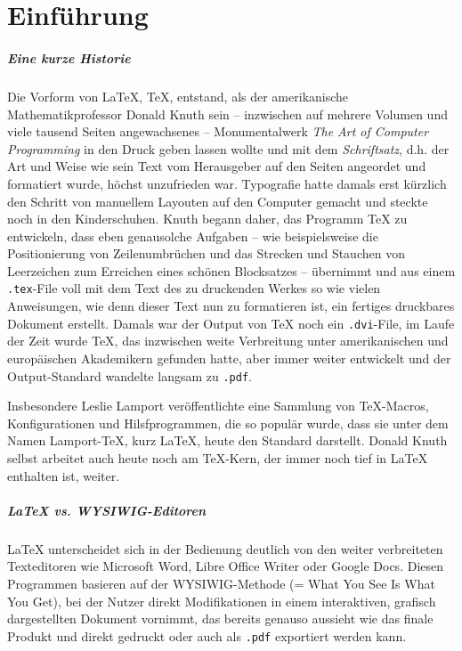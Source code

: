 \chapter{Einführung}

\paragraph{Eine kurze Historie}
Die Vorform von \LaTeX{}, \TeX{}, entstand, als der amerikanische Mathematikprofessor Donald Knuth sein -- inzwischen auf mehrere Volumen und viele tausend Seiten angewachsenes -- Monumentalwerk \emph{The Art of Computer Programming} in den Druck geben lassen wollte und mit dem \emph{Schriftsatz}, d.h. der Art und Weise wie sein Text vom Herausgeber auf den Seiten angeordet und formatiert wurde, höchst unzufrieden war.
Typografie hatte damals erst kürzlich den Schritt von manuellem Layouten auf den Computer gemacht und steckte noch in den Kinderschuhen.
Knuth begann daher, das Programm \TeX{} zu entwickeln, dass eben genausolche Aufgaben -- wie beispielsweise die Positionierung von Zeilenumbrüchen und das Strecken und Stauchen von Leerzeichen zum Erreichen eines schönen Blocksatzes -- übernimmt und aus einem \texttt{.tex}-File voll mit dem Text des zu druckenden Werkes so wie vielen Anweisungen, wie denn dieser Text nun zu formatieren ist, ein fertiges druckbares Dokument erstellt.
Damals war der Output von \TeX{} noch ein \texttt{.dvi}-File, im Laufe der Zeit wurde \TeX{}, das inzwischen weite Verbreitung unter amerikanischen und europäischen Akademikern gefunden hatte, aber immer weiter entwickelt und der Output-Standard wandelte langsam zu \texttt{.pdf}.

Insbesondere Leslie Lamport veröffentlichte eine Sammlung von \TeX{}-Macros, Konfigurationen und Hilsfprogrammen, die so populär wurde, dass sie unter dem Namen Lamport-\TeX{}, kurz \LaTeX{}, heute den Standard darstellt.
Donald Knuth selbst arbeitet auch heute noch am \TeX{}-Kern, der immer noch tief in \LaTeX{} enthalten ist, weiter.

\paragraph{\LaTeX{} vs. WYSIWIG-Editoren}
\LaTeX{} unterscheidet sich in der Bedienung deutlich von den weiter verbreiteten Texteditoren wie Microsoft Word, Libre Office Writer oder Google Docs.
Diesen Programmen basieren auf der WYSIWIG-Methode (= What You See Is What You Get), bei der Nutzer direkt Modifikationen in einem interaktiven, grafisch dargestellten Dokument vornimmt, das bereits genauso aussieht wie das finale Produkt und direkt gedruckt oder auch als \texttt{.pdf} exportiert werden kann.

